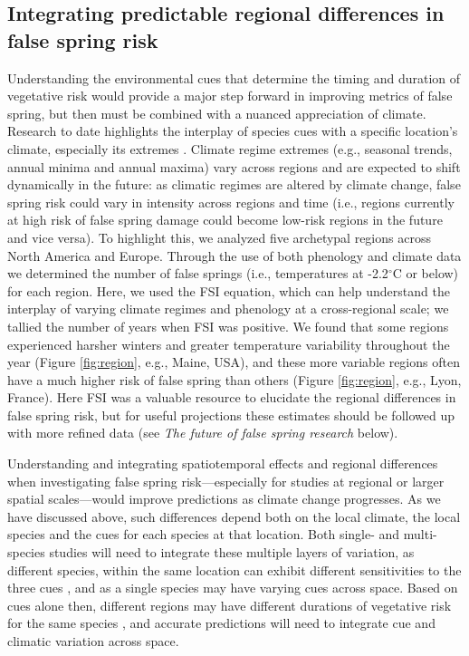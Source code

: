 \documentclass{article}\usepackage[]{graphicx}\usepackage[]{color}
\begin{document}
\subsection* {Integrating predictable regional differences in false spring risk} 
Understanding the environmental cues that determine the timing and duration of vegetative risk would provide a major step forward in improving metrics of false spring, but then must be combined with a nuanced appreciation of climate. Research to date \citep{Hanninen2011, Savolainen2007, Vitasse2009} highlights the interplay of species cues with a specific location's climate, especially its extremes \citep{Jochner2011, Reyer2013}. Climate regime extremes (e.g., seasonal trends, annual minima and annual maxima) vary across regions and are expected to shift dynamically in the future: as climatic regimes are altered by climate change, false spring risk could vary in intensity across regions and time (i.e., regions currently at high risk of false spring damage could become low-risk regions in the future and vice versa). To highlight this, we analyzed five archetypal regions across North America and Europe. Through the use of both phenology \citep{Soudani2012, Schaber2005, USA-NPN2016, White2009} and climate data \citep[from the NOAA Climate Data Online tool][]{NOAA} we determined the number of false springs (i.e., temperatures at -2.2$^{\circ}$C or below) for each region. Here, we used the FSI equation, which can help understand the interplay of varying climate regimes and phenology at a cross-regional scale; we tallied the number of years when FSI was positive. We found that some regions experienced harsher winters and greater temperature variability throughout the year (Figure \ref{fig:region}, e.g., Maine, USA), and these more variable regions often have a much higher risk of false spring than others (Figure \ref{fig:region}, e.g., Lyon, France). Here FSI was a valuable resource to elucidate the regional differences in false spring risk, but for useful projections these estimates should be followed up with more refined data (see \emph{The future of false spring research} below). 

Understanding and integrating spatiotemporal effects and regional differences when investigating false spring risk---especially for studies at regional or larger spatial scales---would improve predictions as climate change progresses. As we have discussed above, such differences depend both on the local climate, the local species and the cues for each species at that location. Both single- and multi-species studies will need to integrate these multiple layers of variation, as different species, within the same location can exhibit different sensitivities to the three cues \citep{Basler2012, Laube2013}, and as a single species may have varying cues across space. Based on cues alone then, different regions may have different durations of vegetative risk for the same species \citep {Caffarra2011, Partanen2004, Viheraaarnio2006}, and accurate predictions will need to integrate cue and climatic variation across space.
\end{document}
